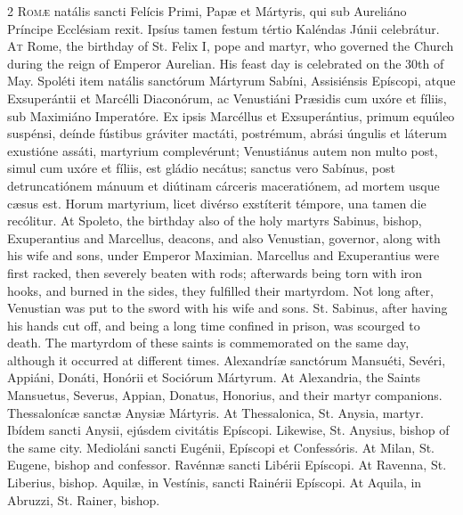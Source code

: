 \begin{paracol}{2}
\lettrine[lines=2]{R}{omæ} natális sancti Felícis Primi, Papæ et 
 Mártyris, qui sub Aureliáno Príncipe Ecclésiam rexit. Ipsíus tamen 
 festum tértio Kaléndas Júnii celebrátur.
\switchcolumn
{}
\lettrine[lines=2]{A}{t} Rome, the birthday of St. Felix I, pope and martyr, who governed the 
 Church during the reign of Emperor Aurelian. His feast day is 
 celebrated on the 30th of May.
\switchcolumn*
{}
Spoléti item natális sanctórum Mártyrum Sabíni, Assisiénsis Epíscopi, atque 
 Exsuperántii et Marcélli Diaconórum, ac Venustiáni Præsidis 
 cum uxóre et fíliis, sub Maximiáno Imperatóre. Ex ipsis Marcéllus et Exsuperántius, primum equúleo suspénsi, deínde fústibus gráviter mactáti, 
 postrémum, abrási úngulis et láterum exustióne assáti, martyrium 
 complevérunt; Venustiánus autem non multo post, simul cum uxóre et fíliis, 
 est gládio necátus; sanctus vero Sabínus, post detruncatiónem mánuum et 
 diútinam cárceris maceratiónem, ad mortem usque cæsus est. Horum 
 martyrium, licet divérso exstíterit témpore, una tamen die recólitur.
\switchcolumn
{}
At Spoleto, the birthday also of the holy martyrs Sabinus, bishop, 
 Exuperantius and Marcellus, deacons, and also Venustian, governor, along 
 with his wife and sons, under Emperor Maximian. Marcellus and 
 Exuperantius were first racked, then severely beaten with rods; afterwards 
 being torn with iron hooks, and burned in the sides, they fulfilled their 
 martyrdom. Not long after, Venustian was put to the sword with his 
 wife and sons. St. Sabinus, after having his hands cut off, and being 
 a long time confined in prison, was scourged to death. The martyrdom 
 of these saints is commemorated on the same day, although it occurred at 
 different times.
\switchcolumn*
{}
Alexandríæ sanctórum Mansuéti, Sevéri, Appiáni, 
 Donáti, Honórii et Sociórum Mártyrum.
\switchcolumn
{}
At Alexandria, the Saints Mansuetus, Severus, Appian, Donatus, Honorius, and 
 their martyr companions.
\switchcolumn*
{}
Thessalonícæ sanctæ Anysiæ Mártyris.
\switchcolumn
{}
At Thessalonica, St. Anysia, martyr.
\switchcolumn*
{}
Ibídem sancti Anysii, ejúsdem civitátis Epíscopi.
\switchcolumn
{}
Likewise, St. Anysius, bishop of the same city.
\switchcolumn*
{}
Medioláni sancti Eugénii, Epíscopi et Confessóris.
\switchcolumn
{}
At Milan, St. Eugene, bishop and confessor.
\switchcolumn*
{}
Ravénnæ sancti Libérii Epíscopi.
\switchcolumn
{}
At Ravenna, St. Liberius, bishop.
\switchcolumn*
{}
Aquilæ, in Vestínis, sancti Rainérii Epíscopi.
\switchcolumn
{}
At Aquila, in Abruzzi, St. Rainer, bishop.
\switchcolumn*
{}
\end{paracol}



